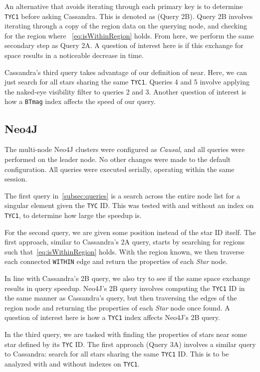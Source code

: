 An alternative that avoids iterating through each primary key is to determine \texttt{TYC1} before asking Cassandra.
This is denoted as (Query 2B).
Query 2B involves iterating through a copy of the region data on the querying node, and checking for the region where
~\autoref{eq:isWithinRegion} holds.
From here, we perform the same secondary step as Query 2A\@.
A question of interest here is if this exchange for space results in a noticeable decrease in time.

Cassandra's third query takes advantage of our definition of near.
Here, we can just search for all stars sharing the same \texttt{TYC1}.
Queries 4 and 5 involve applying the naked-eye visibility filter to queries 2 and 3.
Another question of interest is how a \texttt{BTmag} index affects the speed of our query.

\subsection{Neo4J}\label{subsec:neo4j}
The multi-node Neo4J clusters were configured as \textit{Causal}, and all queries were performed on
the leader node.
No other changes were made to the default configuration.
All queries were executed serially, operating within the same session.

The first query in~\autoref{subsec:queries} is a search across the entire node list for a singular element given the
\texttt{TYC} ID\@.
This was tested with and without an index on \texttt{TYC1}, to determine how large the speedup is.

For the second query, we are given some position instead of the star ID itself.
The first approach, similar to Cassandra's 2A query, starts by searching for regions such
that~\autoref{eq:isWithinRegion} holds.
With the region known, we then traverse each connected \texttt{WITHIN} edge and return the properties of each
\textit{Star} node.

In line with Cassandra's 2B query, we also try to see if the same space exchange results in query speedup.
Neo4J's 2B query involves computing the \texttt{TYC1} ID in the same manner as Cassandra's query, but
then traversing the edges of the region node and returning the properties of each \textit{Star} node once found.
A question of interest here is how a \texttt{TYC1} index affects Neo4J's 2B query.

In the third query, we are tasked with finding the properties of stars near some star defined by its \texttt{TYC} ID\@.
The first approach (Query 3A) involves a similar query to Cassandra: search for all stars sharing the same
\texttt{TYC1} ID\@.
This is to be analyzed with and without indexes on \texttt{TYC1}.

